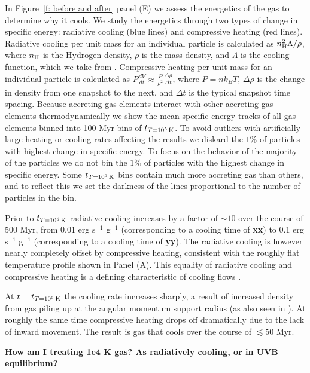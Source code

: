 \documentclass[fleqn,usenatbib]{mnras}
\newcommand{\tcon}{t_{T=10^5\,{\rm K}}}
\newcommand{\nH}{n_{\rm H}}
\begin{document}
In Figure~\ref{f: before and after} panel (E) we assess the energetics of the gas to determine why it cools.
We study the energetics through two types of change in specific energy: radiative cooling (blue lines) and compressive heating (red lines).
Radiative cooling per unit mass for an individual particle is calculated as $\nH^2 \Lambda / \rho$, where $\nH$ is the Hydrogen density, $\rho$ is the mass density, and $\Lambda$ is the cooling function, which we take from \cite{Wiersma2009a}.
Compressive heating per unit mass for an individual particle is calculated as $P \frac{dV}{dt} \approx \frac{ P }{ \rho^2 } \frac{ \Delta \rho }{ \Delta t }$, where $P = n k_B T$, $\Delta \rho$ is the change in density from one snapshot to the next, and $\Delta t$ is the typical snapshot time spacing.
Because accreting gas elements interact with other accreting gas elements thermodynamically we show the mean specific energy tracks of all gas elements binned into 100 Myr bins of $\tcon$.
To avoid outliers with artificially-large heating or cooling rates affecting the results we diskard the $1\%$ of particles with highest change in specific energy.
To focus on the behavior of the majority of the particles we do not bin the $1\%$ of particles with the highest change in specific energy.
Some $\tcon$ bins contain much more accreting gas than others, and to reflect this we set the darkness of the lines proportional to the number of particles in the bin.

Prior to $\tcon$ radiative cooling increases by a factor of $\sim 10$ over the course of 500 Myr, from 0.01 erg s$^{-1}$ g$^{-1}$ (corresponding to a cooling time of \textbf{xx}) to 0.1 erg s$^{-1}$ g$^{-1}$ (corresponding to a cooling time of \textbf{yy}).
The radiative cooling is however nearly completely offset by compressive heating, consistent with the roughly flat temperature profile shown in Panel (A).
This equality of radiative cooling and compressive heating is a defining characteristic of cooling flows \citep{Mathews78, McNamara2007, Stern20}. 

At $t=\tcon$ the cooling rate increases sharply, a result of increased density from gas piling up at the angular momentum support radius (as also seen in \citealt{Trapp2021}).
At roughly the same time compressive heating drops off dramatically due to the lack of inward movement.
The result is gas that cools over the course of $\lesssim 50$ Myr.

\textbf{
How am I treating 1e4 K gas?
As radiatively cooling, or in UVB equilibrium?
}
\end{document}
